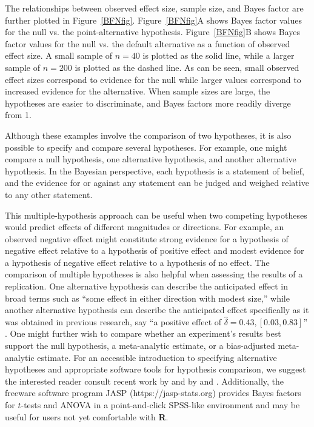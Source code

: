 \documentclass[man]{apa6}
\begin{document}
The relationships between observed effect size, sample size, and Bayes factor are further plotted in Figure~\ref{BFNfig}. Figure~\ref{BFNfig}A shows Bayes factor values for the null vs. the point-alternative hypothesis. Figure~\ref{BFNfig}B shows Bayes factor values for the null vs. the default alternative as a function of observed effect size. A small sample of $n=40$ is plotted as the solid line, while a larger sample of $n=200$ is plotted as the dashed line. As can be seen, small observed effect sizes correspond to evidence for the null while larger values correspond to increased evidence for the alternative. When sample sizes are large, the hypotheses are easier to discriminate, and Bayes factors more readily diverge from 1.  

Although these examples involve the comparison of two hypotheses, it is also possible to specify and compare several hypotheses. For example, one might compare a null hypothesis, one alternative hypothesis, and another alternative hypothesis. In the Bayesian perspective, each hypothesis is a statement of belief, and the evidence for or against any statement can be judged and weighed relative to any other statement. 

This multiple-hypothesis approach can be useful when two competing hypotheses would predict effects of different magnitudes or directions. For example, an observed negative effect might constitute strong evidence for a hypothesis of negative effect relative to a hypothesis of positive effect and modest evidence for a hypothesis of negative effect relative to a hypothesis of no effect. The comparison of multiple hypotheses is also helpful when assessing the results of a replication. One alternative hypothesis can describe the anticipated effect in broad terms such as ``some effect in either direction with modest size,'' while another alternative hypothesis can describe the anticipated effect specifically as it was obtained in previous research, say ``a positive effect of $\hat{\delta} = 0.43, [0.03, 0.83]$'' \citep[see][for an example]{Boekel:etal:2014}. 
One might further wish to compare whether an experiment's results best support the null hypothesis, a meta-analytic estimate, or a bias-adjusted meta-analytic estimate.  For an accessible introduction to specifying alternative hypotheses and appropriate software tools for hypothesis comparison, we suggest the interested reader consult recent work by \citet{Dienes:2011,Dienes:2014} and by \citet{Rouder:Morey:2012} and \citet{Rouder:etal:2012}. Additionally, the freeware software program JASP (https://jasp-stats.org) provides Bayes factors for $t$-tests and ANOVA in a point-and-click SPSS-like environment and may be useful for users not yet comfortable with {\bf R}. 
\end{document}
